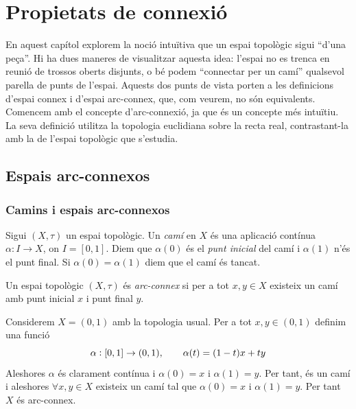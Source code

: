 \documentclass[../main.tex]{subfiles}
\begin{document}
\chapter{Propietats de connexió}

En aquest capítol explorem la noció intuïtiva que un espai topològic sigui ``d'una peça''. Hi ha dues maneres de visualitzar aquesta idea: l'espai no es trenca en reunió de trossos oberts disjunts, o bé podem ``connectar per un camí'' qualsevol parella de punts de l'espai. Aquests dos punts de vista porten a les definicions d'espai connex i d'espai arc-connex, que, com veurem, no són equivalents. Comencem amb el concepte d'arc-connexió, ja que és un concepte més intuïtiu. La seva definició utilitza la topologia euclidiana sobre la recta real, contrastant-la amb la de l'espai topològic que s'estudia.


\section{Espais arc-connexos}
\subsection{Camins i espais arc-connexos}

\begin{defi}
[Camí]\label{def:cami} Sigui $(X,\tau)$ un espai topològic. Un \textit{camí} en $X$ és una aplicació contínua $\alpha:I\rightarrow X$, on $I=[0,1]$. Diem que $\alpha(0)$ és el \textit{punt inicial} del camí i $\alpha(1)$ n'és el punt final. Si $\alpha(0) = \alpha(1)$ diem que el camí és tancat.
\end{defi}

\begin{defi}
\label{def:arcconnex} Un espai topològic $(X,\tau)$ és \textit{arc-connex} si per a tot $x,y\in X$ existeix un camí amb punt inicial $x$ i punt final $y$.
\end{defi}

\begin{ej}
\label{ej:arcconnex1} Considerem $X = (0,1)$ amb la topologia usual. Per a tot $x,y\in (0,1)$ definim una funció
\begin{equation}
    \notag
    \alpha:[0,1]\rightarrow (0,1),\qquad \alpha(t) = (1-t)x+ty
\end{equation}
Aleshores $\alpha$ és clarament contínua i $\alpha(0) = x$ i $\alpha(1) = y$. Per tant, és un camí i aleshores $\forall x,y\in X$ existeix un camí tal que $\alpha(0)=x$ i $\alpha(1) = y$. Per tant $X$ és arc-connex.
\end{ej}
\end{document}
